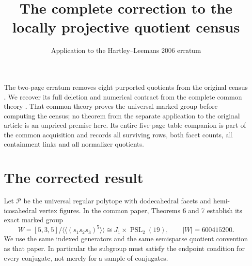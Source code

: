 \documentclass[11pt,a4paper]{article}
\title{The complete correction to the locally projective quotient census}
\author{Application to the Hartley--Leemans 2006 erratum}\date{}
\newcommand{\PSL}{\operatorname{PSL}}\newcommand{\Aut}{\operatorname{Aut}}
\begin{document}
\maketitle
The two-page erratum \cite{erratum} removes eight purported quotients from the original census \cite{source}. We recover its full deletion and numerical contract from the complete common theory \cite{common}. That common theory proves the universal marked group before computing the census; no theorem from the separate application to the original article is an unpriced premise here. Its entire five-page table companion is part of the common acquisition and records all surviving rows, both facet counts, all containment links and all normalizer quotients.

\section{The corrected result}
Let $\mathcal P$ be the universal regular polytope with dodecahedral facets and hemi-icosahedral vertex figures. In the common paper, Theorems 6 and 7 establish its exact marked group
\[
 W=[5,3,5]/\langle\!\langle(s_1s_2s_3)^5\rangle\!\rangle
   \cong J_1\times\PSL_2(19),\qquad |W|=600415200.
\]
We use the same indexed generators and the same semisparse quotient convention as that paper. In particular the subgroup must satisfy the endpoint condition for every conjugate, not merely for a sample of conjugates.
\end{document}
